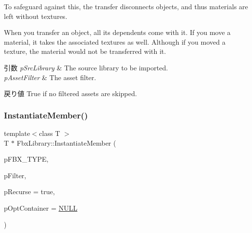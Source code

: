 To safeguard against this, the transfer disconnects objects, and thus materials are left without textures.

When you transfer an object, all its dependents come with it. If you move a material, it takes the associated textures as well. Although if you moved a texture, the material would not be transferred with it. 
\begin{DoxyParams}{引数}
{\em p\+Src\+Library} & The source library to be imported. \\
\hline
{\em p\+Asset\+Filter} & The asset filter. \\
\hline
\end{DoxyParams}
\begin{DoxyReturn}{戻り値}
{\ttfamily True} if no filtered assets are skipped. 
\end{DoxyReturn}
\mbox{\label{class_fbx_library_a9b4d4a5327f1ef11bd0251a968ce9452}} 
\subsubsection{\texorpdfstring{Instantiate\+Member()}{InstantiateMember()}}
{\footnotesize\ttfamily template$<$class T $>$ \\
T $\ast$ Fbx\+Library\+::\+Instantiate\+Member (\begin{DoxyParamCaption}\item[{const T $\ast$}]{p\+F\+B\+X\+\_\+\+T\+Y\+PE,  }\item[{const \hyperlink{class_fbx_object_filter}{Fbx\+Object\+Filter} \&}]{p\+Filter,  }\item[{bool}]{p\+Recurse = {\ttfamily true},  }\item[{\hyperlink{class_fbx_object}{Fbx\+Object} $\ast$}]{p\+Opt\+Container = {\ttfamily \hyperlink{fbxarch_8h_a070d2ce7b6bb7e5c05602aa8c308d0c4}{N\+U\+LL}} }\end{DoxyParamCaption})}

